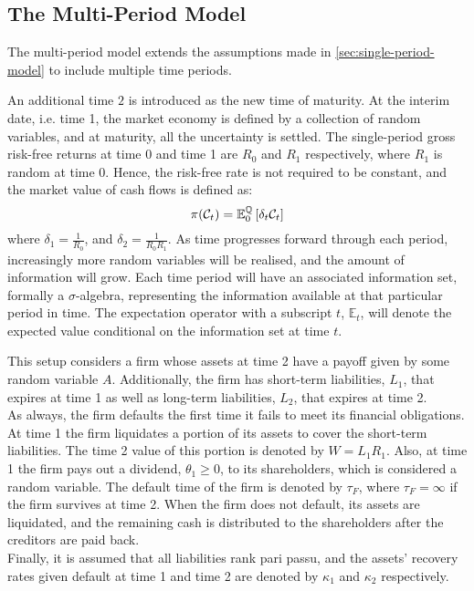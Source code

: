 \documentclass[main.tex]{subfiles}
\begin{document}
    \subsection{The Multi-Period Model}
        The multi-period model extends the assumptions made in \cref{sec:single-period-model} to include multiple time periods.

        An additional time $2$ is introduced as the new time of maturity.
        At the interim date, i.e. time 1, the market economy is defined by a collection of random variables,
        and at maturity, all the uncertainty is settled. 
        The single-period gross risk-free returns at time 0 and time 1 are $R_0$ and $R_1$ respectively, where $R_1$ is random at time 0.
        Hence, the risk-free rate is not required to be constant,
        and the market value of cash flows is defined as:
        \begin{equation*}
            \pi(\mathcal{C}_{t}) =
            \mathbb{E}_{0}^{\mathbb{Q}}\left[\delta_t\mathcal{C}_{t}\right]
        \end{equation*}
        where $\delta_1 = \frac{1}{R_0}$,
        and $\delta_2 = \frac{1}{R_{0}R_{1}}$.
        As time progresses forward through each period, 
        increasingly more random variables will be realised,
        and the amount of information will grow.
        Each time period will have an associated information set, formally a $\sigma$-algebra,
        representing the information available at that particular period in time.
        The expectation operator with a subscript $t$, $\mathbb{E}_{t}$, 
        will denote the expected value conditional on the information set at time $t$.

        This setup considers a firm whose assets at time 2 have a payoff given by some random variable $A$.
        Additionally, the firm has short-term liabilities, $L_1$, that expires at time 1 as well as long-term liabilities, $L_2$, that expires at time 2.
        \\
        As always, the firm defaults the first time it fails to meet its financial obligations.
        At time 1 the firm liquidates a portion of its assets to cover the short-term liabilities.
        The time 2 value of this portion is denoted by $W = L_1 R_1$.
        Also, at time 1 the firm pays out a dividend, $\theta_1 \geq 0$, to its shareholders,
        which is considered a random variable.
        The default time of the firm is denoted by $\tau_{F}$,
        where $\tau_{F} = \infty$ if the firm survives at time 2.
        When the firm does not default, its assets are liquidated, 
        and the remaining cash is distributed to the shareholders after the creditors are paid back.
        \\
        Finally, it is assumed that all liabilities rank pari passu,
        and the assets' recovery rates given default at time 1 and time 2 
        are denoted by $\kappa_1$ and $\kappa_2$ respectively.
\end{document}
